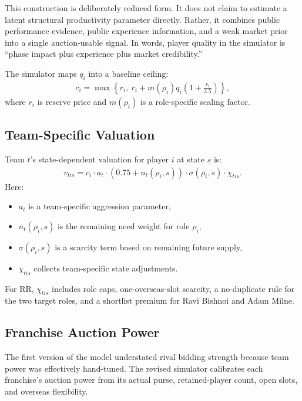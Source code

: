 \documentclass[11pt]{article}
\begin{document}
This construction is deliberately reduced form. It does not claim to estimate a latent structural productivity parameter directly. Rather, it combines public performance evidence, public experience information, and a weak market prior into a single auction-usable signal. In words, player quality in the simulator is ``phase impact plus experience plus market credibility.''

The simulator maps \(q_i\) into a baseline ceiling:
\begin{align}
c_i = \max\left\{r_i,\ r_i + m(\rho_i)q_i\left(1+\frac{r_i}{3.5}\right)\right\},
\end{align}
where \(r_i\) is reserve price and \(m(\rho_i)\) is a role-specific scaling factor.

\subsection{Team-Specific Valuation}

Team \(t\)'s state-dependent valuation for player \(i\) at state \(s\) is:
\begin{align}
v_{tis}
=
c_i\cdot a_t\cdot \left(0.75+n_t(\rho_i,s)\right)\cdot \sigma(\rho_i,s)\cdot \chi_{tis}.
\end{align}
Here:
\begin{itemize}[leftmargin=1.5em]
    \item \(a_t\) is a team-specific aggression parameter,
    \item \(n_t(\rho_i,s)\) is the remaining need weight for role \(\rho_i\),
    \item \(\sigma(\rho_i,s)\) is a scarcity term based on remaining future supply,
    \item \(\chi_{tis}\) collects team-specific state adjustments.
\end{itemize}

For RR, \(\chi_{tis}\) includes role caps, one-overseas-slot scarcity, a no-duplicate rule for the two target roles, and a shortlist premium for Ravi Bishnoi and Adam Milne.

\subsection{Franchise Auction Power}

The first version of the model understated rival bidding strength because team power was effectively hand-tuned. The revised simulator calibrates each franchise's auction power from its actual purse, retained-player count, open slots, and overseas flexibility.
\end{document}
